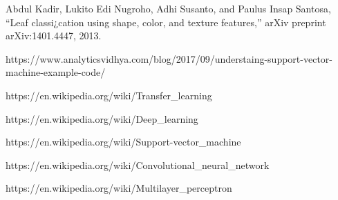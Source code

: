 \begin{thebibliography}{99}
Abdul Kadir, Lukito Edi Nugroho, Adhi Susanto, and Paulus Insap
Santosa, “Leaf classi¿cation using shape, color, and texture features,”
arXiv preprint arXiv:1401.4447, 2013.

https://www.analyticsvidhya.com/blog/2017/09/understaing-support-vector- machine-example-code/

https://en.wikipedia.org/wiki/Transfer\_learning

https://en.wikipedia.org/wiki/Deep\_learning

https://en.wikipedia.org/wiki/Support-vector\_machine

https://en.wikipedia.org/wiki/Convolutional\_neural\_network

https://en.wikipedia.org/wiki/Multilayer\_perceptron

\end{thebibliography}



\clearpage










%